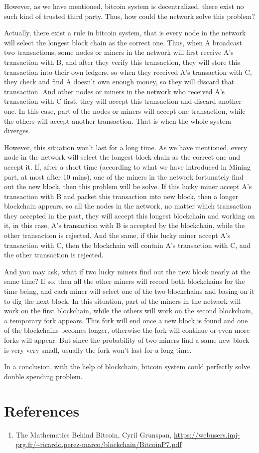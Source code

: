 \documentclass[12pt,a4paper]{article}
\begin{document}
 However, as we have mentioned, bitcoin system is decentralized, there exist no such kind of trusted third party. Thus, how could the network solve this problem?
 
 Actually, there exist a rule in bitcoin system, that is every node in the network will select the longest block chain as the correct one. Thus, when A broadcast two transactions, some nodes or miners in the network will first receive A's transaction with B, and after they verify this transaction, they will store this transaction into their own ledgers, so when they received A's transaction with C, they check and find A doesn't own enough money, so they will discard that transaction. And other nodes or miners in the network who received A's transaction with C first, they will accept this transaction and discard another one. In this case, part of the nodes or miners will accept one transaction, while the others will accept another transaction. That is when the whole system diverges.
 
 However, this situation won't last for a long time. As we have mentioned, every node in the network will select the longest block chain as the correct one and accept it. If, after a short time (according to what we have introduced in Mining part, at most after 10 mins), one of the miners in the network fortunately find out the new block, then this problem will be solve. If this lucky miner accept A's transaction with B and packet this transaction into new block, then a longer blockchain appears, so all the nodes in the network, no matter which transaction they accepted in the past, they will accept this longest blockchain and working on it, in this case, A's transaction with B is accepted by the blockchain, while the other transaction is rejected. And the same, if this lucky miner accept A's transaction with C, then the blockchain will contain A's transaction with C, and the other transaction is rejected.
 
 And you may ask, what if two lucky miners find out the new block nearly at the same time? If so, then all the other miners will record both blockchains for the time being, and each miner will select one of the two blockchains and basing on it to dig the next block. In this situation, part of the miners in the network will work on the first blockchain, while the others will work on the second blockchain, a temporary fork appears. This fork will end once a new block is found and one of the blockchains becomes longer, otherwise the fork will continue or even more forks will appear. But since the probability of two miners find a same new block is very very small, usually the fork won't last for a long time.
 
In a conclusion, with the help of blockchain, bitcoin system could perfectly solve double spending problem.
\section{References}
\begin{enumerate}
	\item The Mathematics Behind Bitcoin, Cyril Grunspan, \url{https://webusers.imj-prg.fr/~ricardo.perez-marco/blockchain/BitcoinP7.pdf}
\end{enumerate}
\end{document}
